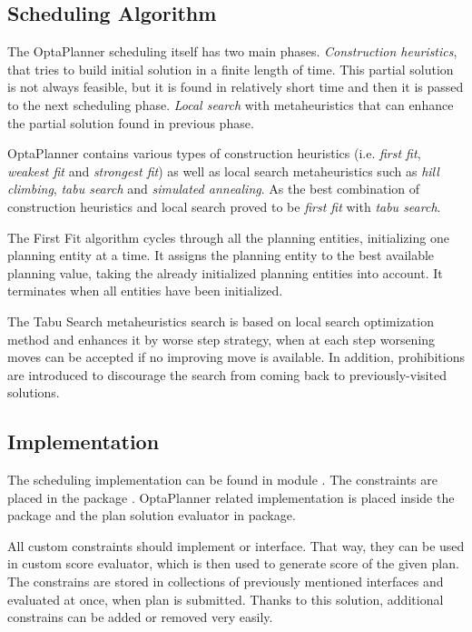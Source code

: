 \subsection{Scheduling Algorithm}
The OptaPlanner scheduling itself has two main phases.
\textit{Construction heuristics}, that tries to build initial solution in a finite length of time.
This partial solution is not always feasible, 
but it is found in relatively short time and then it is passed to the next scheduling phase.
\textit{Local search} with metaheuristics that can enhance the partial solution found in previous phase.

OptaPlanner contains various types of construction heuristics (i.e. \textit{first fit}, \textit{weakest fit} and \textit{strongest fit})
as well as local search metaheuristics such as \textit{hill climbing}, \textit{tabu search} and \textit{simulated annealing}.
As the best combination of construction heuristics and local search proved to be \textit{first fit} with \textit{tabu search}.

The First Fit algorithm cycles through all the planning entities,
initializing one planning entity at a time. 
It assigns the planning entity to the best available planning value, 
taking the already initialized planning entities into account.
It terminates when all entities have been initialized\cite{optaplannerDoc:heuristics}.

The Tabu Search metaheuristics search is based on local search optimization method
and enhances it by worse step strategy, 
when at each step worsening moves can be accepted if no improving move is available.
In addition, prohibitions are introduced to discourage the search from coming back to previously-visited solutions\cite{glover1989tabu}.

\subsection{Implementation}
The scheduling implementation can be found in module .
The constraints are placed in the package .
OptaPlanner related implementation is placed inside the  package
and the plan solution evaluator in  package.

All custom constraints should implement  
or  interface.
That way, 
they can be used in custom score evaluator,
which is then used to generate score of the given plan.
The constrains are stored in collections of previously mentioned interfaces 
and evaluated at once, when plan is submitted.
Thanks to this solution,
additional constrains can be added or removed very easily.

